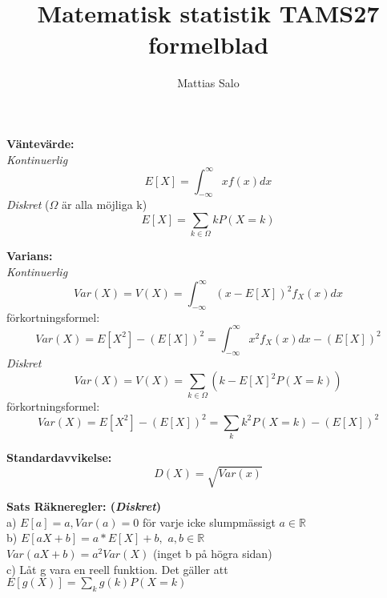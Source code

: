 \documentclass[8pt]{extarticle}
\title{Matematisk statistik TAMS27 formelblad}
\author{Mattias Salo}
\begin{document}
\maketitle
\begin{multicols*}{2}


\textbf{Väntevärde:}\\
\textit{Kontinuerlig}
\begin{equation*}
E[X] = \int_{-\infty}^{\infty} xf(x) dx
\end{equation*}
\textit{Diskret} ($\Omega$ är alla möjliga k)
\begin{equation*}
E[X] = \sum_{k \in \Omega} kP(X = k)
\end{equation*}

\textbf{Varians:}\\
\textit{Kontinuerlig}
\begin{equation*}
Var(X) = V(X) = \int_{-\infty}^{\infty} (x - E[X])^2 f_X(x)dx
\end{equation*}
förkortningsformel:
\begin{equation*}
Var(X) = E[X^2] - (E[X])^2 = \int_{-\infty}^{\infty} x^2 f_X(x)dx - (E[X])^2
\end{equation*}
\textit{Diskret}
\begin{equation*}
Var(X) = V(X) = \sum_{k \in \Omega} (k - E[X]^2P(X = k))
\end{equation*}
förkortningsformel:
\begin{equation*}
Var(X) = E[X^2] - (E[X])^2 = \sum_k k^2P(X=k) - (E[X])^2
\end{equation*}

\textbf{Standardavvikelse:}\\
\begin{equation*}
D(X) = \sqrt{Var(x)}
\end{equation*}

\textbf{Sats Räkneregler: (\textit{Diskret})}\\
a) $ E[a] = a, Var(a) = 0$ för varje icke slumpmässigt $a\in \mathbb{R}$\\
b) $E[aX + b] = a * E[X] + b ,$   $a, b \in \mathbb{R}$\\
$Var(aX + b) = a^2Var(X)$ (inget b på högra sidan)\\
c) Låt g vara en reell funktion. Det gäller att $E[g(X)] = \sum_k g(k)P(X = k)$\\


\end{multicols*}
\end{document}
